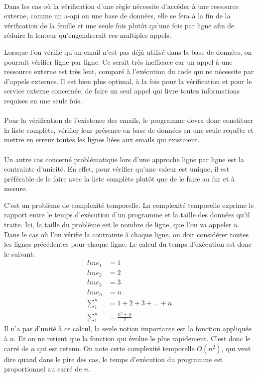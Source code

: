 \paragraph{}
Dans les cas où la vérification d'une règle nécessite d'accéder à une ressource externe, comme un \gls{a-api} ou une base de données,
elle se fera à la fin de la vérification de la feuille et une seule fois plutôt qu'une fois par ligne afin de réduire la lenteur qu'engendrerait ces multiples appels.

Lorsque l'on vérifie qu'un email n'est pas déjà utilisé dans la base de données, on pourrait vérifier ligne par ligne.
Ce serait très inefficace car un appel à une ressource externe est très lent, comparé à l'exécution du code qui ne nécessite par d'appels externes.
Il est bien plus optimal, à la fois pour la vérification et pour le service externe concernée, de faire un seul appel qui livre toutes informations requises en une seule fois.

\paragraph{}
Pour la vérification de l'existence des emails, le programme devra donc constituer la liste complète, vérifier leur présence en base de données en une seule requête et mettre en erreur toutes les lignes liées aux emails qui existaient.

\paragraph{}
Un autre cas concerné problématique lors d'une approche ligne par ligne est la contrainte d'unicité.
En effet, pour vérifier qu'une valeur est unique, il est préférable de le faire avec la liste complète plutôt que de le faire au fur et à mesure.

C'est un problème de complexité temporelle.
La complexité temporelle exprime le rapport entre le temps d'exécution d'un programme et la taille des données qu'il traite.
Ici, la taille du problème est le nombre de ligne, que l'on va appeler $n$.
Dans le cas où l'on vérifie la contrainte à chaque ligne, on doit considérer toutes les lignes précédentes pour chaque ligne.
Le calcul du temps d'exécution est donc le suivant:
\begin{align}
line_1&= 1 \\
line_2&= 2 \\
line_3&= 3 \\
line_n&= n \\
\sum_1^n &= 1+2+3+...+n \\
\sum_1^n &= \frac{n^2 + n}{2}
\end{align}
Il n'a pas d'unité à ce calcul, la seule notion importante est la fonction appliquée à $n$.
Et on ne retient que la fonction qui évolue le plus rapidement.
C'est donc le carré de $n$ qui est retenu.
On note cette complexité temporelle $O(n^2)$, qui veut dire quand dans le pire des cas, le temps d'exécution du programme est proportionnel au carré de $n$.

